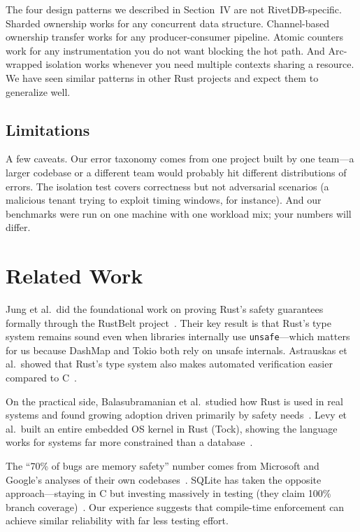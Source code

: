 \documentclass[conference,a4paper]{IEEEtran}
\begin{document}
The four design patterns we described in Section~IV are not RivetDB-specific. Sharded ownership works for any concurrent data structure. Channel-based ownership transfer works for any producer-consumer pipeline. Atomic counters work for any instrumentation you do not want blocking the hot path. And Arc-wrapped isolation works whenever you need multiple contexts sharing a resource. We have seen similar patterns in other Rust projects and expect them to generalize well.

\subsection{Limitations}

A few caveats. Our error taxonomy comes from one project built by one team---a larger codebase or a different team would probably hit different distributions of errors. The isolation test covers correctness but not adversarial scenarios (a malicious tenant trying to exploit timing windows, for instance). And our benchmarks were run on one machine with one workload mix; your numbers will differ.

\section{Related Work}

Jung et al.\ did the foundational work on proving Rust's safety guarantees formally through the RustBelt project~\cite{jung2021rustbelt}. Their key result is that Rust's type system remains sound even when libraries internally use \texttt{unsafe}---which matters for us because DashMap and Tokio both rely on unsafe internals. Astrauskas et al.\ showed that Rust's type system also makes automated verification easier compared to C~\cite{astrauskas2020}.

On the practical side, Balasubramanian et al.\ studied how Rust is used in real systems and found growing adoption driven primarily by safety needs~\cite{balasubramanian2017}. Levy et al.\ built an entire embedded OS kernel in Rust (Tock), showing the language works for systems far more constrained than a database~\cite{levy2017tock}.

The ``70\% of bugs are memory safety'' number comes from Microsoft and Google's analyses of their own codebases~\cite{chromium2024}. SQLite has taken the opposite approach---staying in C but investing massively in testing (they claim 100\% branch coverage)~\cite{sqlite2024testing}. Our experience suggests that compile-time enforcement can achieve similar reliability with far less testing effort.
\end{document}
